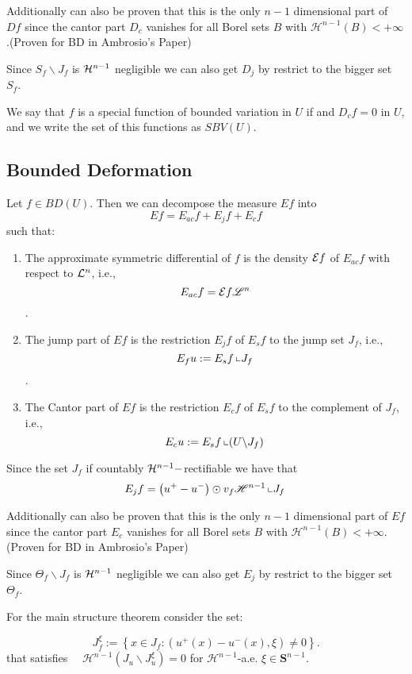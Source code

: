 Additionally can also be proven that this is the only $n-1$ dimensional part of $Df$ since the cantor part $D_c$ vanishes for all Borel sets $B$ with $\mathscr{H}^{n-1}(B)<+\infty$.(Proven for BD in Ambrosio's Paper)

Since $S_f\backslash J_f$ is ${\mathcal H}^{n-1}$ negligible we can also get $D_j$ by restrict to the bigger set $S_f$.


We say that $f$ is a special function of bounded variation in $U$ if and $D _cf=0$ in $U$, and  we write the set of this functions as $S B V(U)$. 
\subsection{Bounded Deformation}

\begin{definition} Let $f \in B D(U)$. Then we can decompose the measure $Ef$ into
$$E f=E _{ac}f+E_jf +E_cf$$
such that:
\begin{enumerate}
\item The approximate symmetric differential of $f$ is the density ${\mathcal E} f$ of $E_{ac} f$ with respect to ${\mathcal L}^n$, i.e., $$E_{ac} f={\mathcal E} f \mathscr{L}^n$$.
\item The jump part of $E f$ is the restriction $E_j f$ of $E_s f$ to the jump set $J_f$, i.e., $$E_f u:=E_s f\left\llcorner J_f\right.$$.
\item The Cantor part of $E f$ is the restriction $E_c f$ of $E_s f$ to the complement of $J_f$, i.e., $$E_c u:=E_s f\left\llcorner\left(U \backslash J_f\right)\right.$$
\end{enumerate}
\end{definition}

Since the set $J_f$ if countably ${\mathcal H}^{n-1}-$rectifiable we have that 
$$E_j f=\left(u^{+}-u^{-}\right) \odot v_f \mathscr{H}^{n-1}\left\llcorner J_f\right.$$

Additionally can also be proven that this is the only $n-1$ dimensional part of $Ef$ since the cantor part $E_c$ vanishes for all Borel sets $B$ with $\mathscr{H}^{n-1}(B)<+\infty$.(Proven for BD in Ambrosio's Paper)

Since $\Theta_f\backslash J_f$ is ${\mathcal H}^{n-1}$ negligible we can also get $E_j$ by restrict to the bigger set $\Theta_f$.

For the main structure theorem consider the set:

$$
J_f^{\xi}:=\left\{x \in J_f:\left(u^{+}(x)-u^{-}(x), \xi\right) \neq 0\right\} .
$$
that satisfies $\quad \mathscr{H}^{n-1}\left(J_u \backslash J_u^{\xi}\right)=0$ for $\mathscr{H}^{n-1}$-a.e. $\xi \in \mathbf{S}^{n-1}$.

